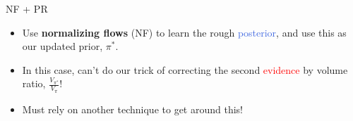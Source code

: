 \documentclass[aspectratio=169, 11pt]{beamer}
\begin{document}
\begin{frame}{NF + PR}
\begin{itemize}\vspace{1em}
    \item<1-> Use \textbf{normalizing flows} (NF) to learn the rough \textcolor{RoyalBlue}{posterior}, and use this as our updated prior, $\pi^\ast$.
    \item<1-> In this case, can't do our trick of correcting the second \textcolor{red}{evidence} by volume ratio, $\frac{V_{\pi^\ast}}{V_{\pi}}$!
    \item<1-> Must rely on another technique to get around this!
\end{itemize}\vspace{2em}
\hspace{2em}\vfill
\begin{minipage}{1\textwidth}
\end{minipage}
\end{frame}
\end{document}
